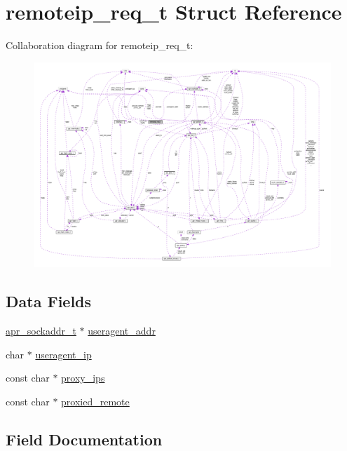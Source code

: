 \hypertarget{structremoteip__req__t}{}\section{remoteip\+\_\+req\+\_\+t Struct Reference}
\label{structremoteip__req__t}


Collaboration diagram for remoteip\+\_\+req\+\_\+t\+:
\nopagebreak
\begin{figure}[H]
\begin{center}
\leavevmode
\includegraphics[width=350pt]{structremoteip__req__t__coll__graph}
\end{center}
\end{figure}
\subsection*{Data Fields}
\begin{DoxyCompactItemize}
\item 
\hyperlink{structapr__sockaddr__t}{apr\+\_\+sockaddr\+\_\+t} $\ast$ \hyperlink{structremoteip__req__t_a2e8ff0497898f3a8745cafc9e5f34035}{useragent\+\_\+addr}
\item 
char $\ast$ \hyperlink{structremoteip__req__t_a162b7158e75401e95e5d40df54cf8032}{useragent\+\_\+ip}
\item 
const char $\ast$ \hyperlink{structremoteip__req__t_a270ca4ec962a690ff8f1b9c095981f97}{proxy\+\_\+ips}
\item 
const char $\ast$ \hyperlink{structremoteip__req__t_a243ef3651318153186aa23dd10b5dddd}{proxied\+\_\+remote}
\end{DoxyCompactItemize}


\subsection{Field Documentation}
